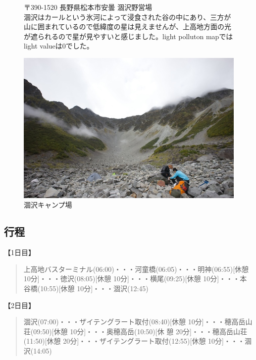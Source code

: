 \documentclass[../main]{subfiles}
\begin{document}
\begin{figure}
\begin{minipage}{0.45\textwidth} %
  〒390-1520 長野県松本市安曇 涸沢野営場 \\

  涸沢はカールという氷河によって浸食された谷の中にあり、三方が山に囲まれているので低緯度の星は見えませんが、上高地方面の光が遮られるので星が見やすいと感じました。light polluton mapではlight valueは0でした。
\end{minipage}%
\hfill
\begin{minipage}{0.45\textwidth} %
    \centering
    \includegraphics[width=\linewidth]{sections/mori/IMG_2413.jpg} %
    \caption{涸沢キャンプ場}
\end{minipage}
\end{figure}

\subsection{行程}
【1日目】
\begin{quote}
  上高地バスターミナル(06:00)・・・河童橋(06:05)・・・明神(06:55)[休憩 10分]・・・徳沢(08:05)[休憩 10分]・・・横尾(09:25)[休憩 10分]・・・本谷橋(10:55)[休憩 10分]・・・涸沢(12:45)
\end{quote}

【2日目】
\begin{quote}
  涸沢(07:00)・・・ザイテングラート取付(08:40)[休憩 10分]・・・穂高岳山荘(09:50)[休憩 10分]・・・奥穂高岳(10:50)[休
  憩 20分]・・・穂高岳山荘(11:50)[休憩 20分]・・・ザイテングラート取付(12:55)[休憩 10分]・・・涸沢(14:05)
\end{quote}
\end{document}
